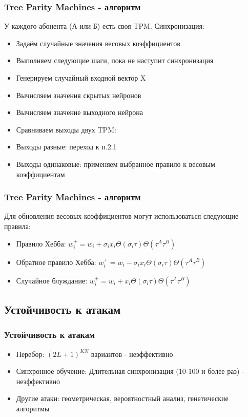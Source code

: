 \documentclass{beamer}
\begin{document}
\begin{frame}
\frametitle{Tree Parity Machines - алгоритм}
У каждого абонента (А или Б) есть своя TPM. 
Синхронизация:
\begin{itemize}

\item Задаём случайные значения весовых коэффициентов
\item Выполняем следующие шаги, пока не наступит синхронизация
\item Генерируем случайный входной вектор X
\item Вычисляем значения скрытых нейронов
\item Вычисляем значение выходного нейрона
\item Сравниваем выходы двух TPM:
\item Выходы разные: переход к п.2.1
\item Выходы одинаковые: применяем выбранное правило к весовым коэффициентам
\end{itemize} 
\end{frame}

\begin{frame}
\frametitle{Tree Parity Machines - алгоритм}
Для обновления весовых коэффициентов могут использоваться следующие правила:


\begin{itemize}

\item Правило Хебба: \(w_i^+=w_i+\sigma_ix_i\Theta(\sigma_i\tau)\Theta(\tau^A\tau^B)\)

\item Обратное правило Хебба: \(w_i^+=w_i-\sigma_ix_i\Theta(\sigma_i\tau)\Theta(\tau^A\tau^B)\)

\item Случайное блуждание: \(w_i^+=w_i+x_i\Theta(\sigma_i\tau)\Theta(\tau^A\tau^B)\)

\end{itemize}
\end{frame}

\subsection{Устойчивость к атакам}
\begin{frame}
\frametitle{Устойчивость к атакам}
\begin{itemize}
\item Перебор:  \((2L+1)^{KN}\) вариантов - неэффективно
\item Синхронное обучение:  Длительная синхронизация (10-100 и более раз) - неэффективно
\item Другие атаки: геометрическая, вероятностный анализ, генетические алгоритмы
\end{itemize}
\end{frame}
\end{document}
